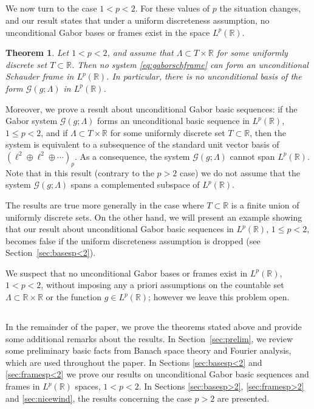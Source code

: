 \documentclass[reqno,a4paper,12pt]{amsart}
\numberwithin{equation}{section}
\numberwithin{figure}{section}
\newcommand\R{\mathbb{R}}
\newcommand\G{\mathcal{G}}
\newcommand\1{\mathds{1}}
\newcommand{\TTT}{T}
\renewcommand\le{\leqslant}
\newcommand\sbt{\subset}
\theoremstyle{plain}
\newtheorem{thm}{Theorem}[section]
\newcommand{\secref}[1]{Section~\ref{#1}}
\theoremstyle{definition}
\begin{document}
\subsection{}
We now turn to the case $1 < p < 2$. For these values of $p$ the situation changes, 
and our result states that under a uniform discreteness assumption, no unconditional 
Gabor bases or frames exist in the space $L^p(\R)$.

\begin{thm}
\label{thm:gabframesp<2}
Let $1<p<2$, and assume that
$\Lambda\subset \TTT\times \R$ for some uniformly discrete set $\TTT\subset\R$.
Then no system \eqref{eq:gaborschframe} can form an unconditional Schauder frame in $L^p(\R)$.
In particular, there is no unconditional basis of the form $\G(g;\Lambda)$ in $L^p(\R)$.
\end{thm}


Moreover, we prove a result about unconditional Gabor basic sequences:
 if the Gabor system $\G(g;\Lambda)$ forms an unconditional basic sequence in $L^p(\R)$, 
 $1 \le p < 2$, and if
 $\Lambda\subset \TTT\times \R$ for some uniformly discrete set $\TTT\subset\R$,
  then the system is equivalent to a subsequence of the standard unit vector basis of $(\ell^2 \oplus\ell^2 \oplus\cdots)_p$. As a consequence, the system $\G(g;\Lambda)$ cannot span $L^p(\R)$. Note that in this result (contrary to the $p>2$ case) we do not assume that the system $\G(g;\Lambda)$ spans a complemented subspace of $L^p(\R)$. 


The results are true more generally in the case where
$\TTT \sbt \R$ is a finite union of uniformly discrete sets.
On the other hand, we will present an example showing that 
our result about unconditional Gabor basic sequences
in $L^p(\R)$, $1 \le p<2$,
becomes false if the uniform discreteness assumption
 is dropped (see \secref{sec:basesp<2}).



We suspect that no unconditional Gabor bases or frames exist in $L^p(\R)$, $1 < p <2$, without imposing any a priori assumptions on the countable set $\Lambda \sbt \R \times \R$ or the
 function $g \in L^p(\R)$; however we leave this problem open.



\subsection{}
In the remainder of the paper, we prove the theorems stated above and
 provide some additional remarks about the results. 
 In \secref{sec:prelim}, we review some preliminary 
basic facts from Banach space theory and Fourier analysis, 
which are used throughout the paper. 
In Sections \ref{sec:basesp<2} and \ref{sec:framesp<2} we 
prove our results on unconditional Gabor basic sequences and 
frames in $L^p(\R)$ spaces, $1 < p <2$.
In Sections \ref{sec:basesp>2}, \ref{sec:framesp>2} 
and \ref{sec:nicewind}, the results concerning  the case $p>2$ are presented.
\end{document}
